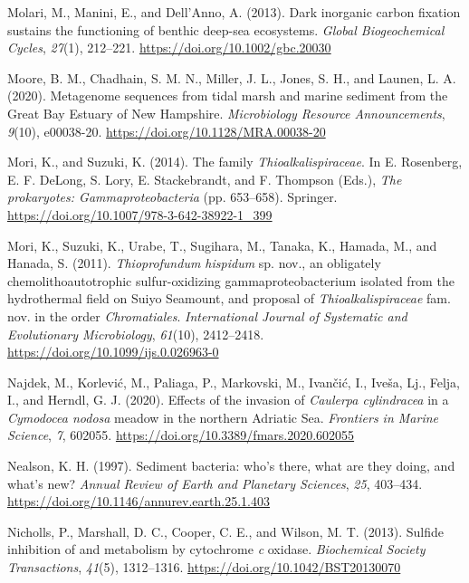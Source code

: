 \documentclass[
  12 pt,
]{book}
\newlength{\cslhangindent}
\newlength{\cslentryspacingunit} %
\newenvironment{CSLReferences}[2] %
 {%
  \setlength{\parindent}{0pt}
  \ifodd #1
  \let\oldpar\par
  \def\par{\hangindent=\cslhangindent\oldpar}
  \fi
  \setlength{\parskip}{#2\cslentryspacingunit}
 }%
 {}
\begin{document}
\begin{CSLReferences}{1}{0}
\leavevmode{}%
Molari, M., Manini, E., and Dell'Anno, A. (2013). Dark inorganic carbon fixation sustains the functioning of benthic deep-sea ecosystems. \emph{Global Biogeochemical Cycles}, \emph{27}(1), 212--221. \url{https://doi.org/10.1002/gbc.20030}

\leavevmode{}%
Moore, B. M., Chadhain, S. M. N., Miller, J. L., Jones, S. H., and Launen, L. A. (2020). Metagenome sequences from tidal marsh and marine sediment from the {Great Bay Estuary} of {New Hampshire}. \emph{Microbiology Resource Announcements}, \emph{9}(10), e00038-20. \url{https://doi.org/10.1128/MRA.00038-20}

\leavevmode{}%
Mori, K., and Suzuki, K. (2014). The family {{\emph{Thioalkalispiraceae}}}. In E. Rosenberg, E. F. DeLong, S. Lory, E. Stackebrandt, and F. Thompson (Eds.), \emph{The prokaryotes: {{\emph{Gammaproteobacteria}}}} (pp. 653--658). Springer. \url{https://doi.org/10.1007/978-3-642-38922-1_399}

\leavevmode{}%
Mori, K., Suzuki, K., Urabe, T., Sugihara, M., Tanaka, K., Hamada, M., and Hanada, S. (2011). {{{\emph{Thioprofundum hispidum}}} sp. nov.,} an obligately chemolithoautotrophic sulfur-oxidizing gammaproteobacterium isolated from the hydrothermal field on {Suiyo Seamount}, and proposal of {{{\emph{Thioalkalispiraceae}}} fam. nov. }in the order {{\emph{Chromatiales}}}. \emph{International Journal of Systematic and Evolutionary Microbiology}, \emph{61}(10), 2412--2418. \url{https://doi.org/10.1099/ijs.0.026963-0}

\leavevmode{}%
Najdek, M., Korlević, M., Paliaga, P., Markovski, M., Ivančić, I., Iveša, Lj., Felja, I., and Herndl, G. J. (2020). Effects of the invasion of {{\emph{Caulerpa cylindracea}}} in a {{\emph{Cymodocea nodosa}}} meadow in the northern {Adriatic Sea}. \emph{Frontiers in Marine Science}, \emph{7}, 602055. \url{https://doi.org/10.3389/fmars.2020.602055}

\leavevmode{}%
Nealson, K. H. (1997). Sediment bacteria: who's there, what are they doing, and what's new? \emph{Annual Review of Earth and Planetary Sciences}, \emph{25}, 403--434. \url{https://doi.org/10.1146/annurev.earth.25.1.403}

\leavevmode{}%
Nicholls, P., Marshall, D. C., Cooper, C. E., and Wilson, M. T. (2013). Sulfide inhibition of and metabolism by cytochrome {{\emph{c}}} oxidase. \emph{Biochemical Society Transactions}, \emph{41}(5), 1312--1316. \url{https://doi.org/10.1042/BST20130070}


\end{CSLReferences}
\end{document}
